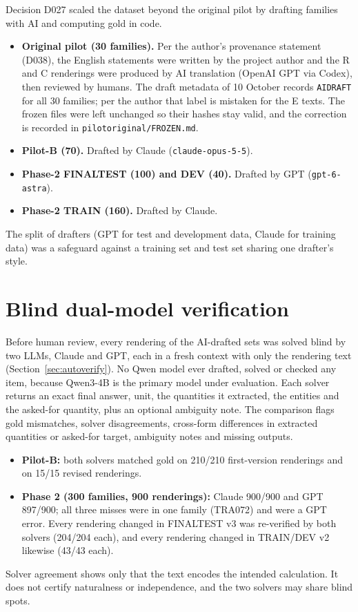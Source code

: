 \documentclass[12pt,a4paper,oneside]{report}
\renewcommand{\_}{\oldunderscore\allowbreak}
\begin{document}
Decision D027 scaled the dataset beyond the original pilot by drafting families with AI and computing gold in code.
\begin{itemize}[nosep]
\item \textbf{Original pilot (30 families).} Per the author's provenance statement (D038), the English statements were written by the project author and the R and C renderings were produced by AI translation (OpenAI GPT via Codex), then reviewed by humans. The draft metadata of 10 October records \texttt{AI\_DRAFT} for all 30 families; per the author that label is mistaken for the E texts. The frozen files were left unchanged so their hashes stay valid, and the correction is recorded in \texttt{pilot\_original/FROZEN.md}.
\item \textbf{Pilot-B (70).} Drafted by Claude (\texttt{claude-opus-5-5}).
\item \textbf{Phase-2 FINAL\_TEST (100) and DEV (40).} Drafted by GPT (\texttt{gpt-6-astra}).
\item \textbf{Phase-2 TRAIN (160).} Drafted by Claude.
\end{itemize}
The split of drafters (GPT for test and development data, Claude for training data) was a safeguard against a training set and test set sharing one drafter's style.

\section{Blind dual-model verification}

Before human review, every rendering of the AI-drafted sets was solved blind by two LLMs, Claude and GPT, each in a fresh context with only the rendering text (Section~\ref{sec:autoverify}). No Qwen model ever drafted, solved or checked any item, because Qwen3-4B is the primary model under evaluation. Each solver returns an exact final answer, unit, the quantities it extracted, the entities and the asked-for quantity, plus an optional ambiguity note. The comparison flags gold mismatches, solver disagreements, cross-form differences in extracted quantities or asked-for target, ambiguity notes and missing outputs.

\begin{itemize}[nosep]
\item \textbf{Pilot-B:} both solvers matched gold on 210/210 first-version renderings and on 15/15 revised renderings.
\item \textbf{Phase 2 (300 families, 900 renderings):} Claude 900/900 and GPT 897/900; all three misses were in one family (TRA072) and were a GPT error. Every rendering changed in FINAL\_TEST v3 was re-verified by both solvers (204/204 each), and every rendering changed in TRAIN/DEV v2 likewise (43/43 each).
\end{itemize}
Solver agreement shows only that the text encodes the intended calculation. It does not certify naturalness or independence, and the two solvers may share blind spots.
\end{document}
